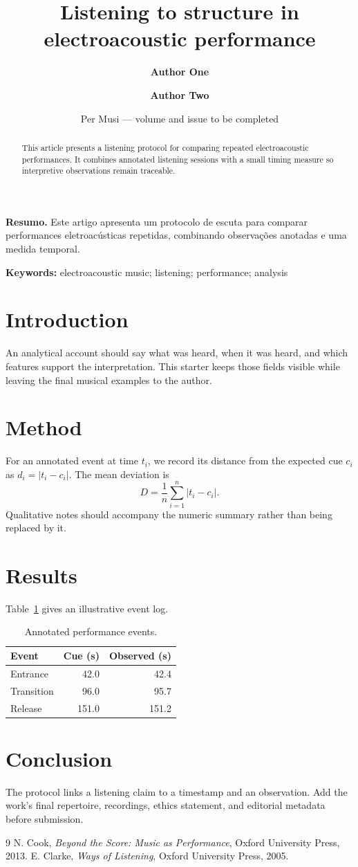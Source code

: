 \documentclass[11pt,a4paper]{article}
\title{Listening to structure in electroacoustic performance}
\author{\textbf{Author One} \and \textbf{Author Two}}
\date{Per Musi --- volume and issue to be completed}
\newcommand{\resumo}[1]{\par\smallskip\textbf{Resumo.} #1}
\newcommand{\keywords}[1]{\par\smallskip\textbf{Keywords:} #1}
\begin{document}
\maketitle
\begin{abstract}
This article presents a listening protocol for comparing repeated
electroacoustic performances. It combines annotated listening sessions with a
small timing measure so interpretive observations remain traceable.
\end{abstract}
\resumo{Este artigo apresenta um protocolo de escuta para comparar performances
eletroacústicas repetidas, combinando observações anotadas e uma medida temporal.}
\keywords{electroacoustic music; listening; performance; analysis}

\section{Introduction}
An analytical account should say what was heard, when it was heard, and which
features support the interpretation. This starter keeps those fields visible
while leaving the final musical examples to the author.

\section{Method}
For an annotated event at time $t_i$, we record its distance from the expected
cue $c_i$ as $d_i=|t_i-c_i|$. The mean deviation is
\begin{equation}
  D=\frac{1}{n}\sum_{i=1}^{n}|t_i-c_i|.
\end{equation}
Qualitative notes should accompany the numeric summary rather than being
replaced by it.

\section{Results}
Table~\ref{tab:events} gives an illustrative event log.
\begin{table}[ht]
\centering
\caption{Annotated performance events.}
\label{tab:events}
\begin{tabular}{lrr}
\toprule
Event & Cue (s) & Observed (s)\\
\midrule
Entrance & 42.0 & 42.4\\
Transition & 96.0 & 95.7\\
Release & 151.0 & 151.2\\
\bottomrule
\end{tabular}
\end{table}

\section{Conclusion}
The protocol links a listening claim to a timestamp and an observation. Add
the work's final repertoire, recordings, ethics statement, and editorial
metadata before submission.

\begin{thebibliography}{9}
 N. Cook, \emph{Beyond the Score: Music as Performance}, Oxford
University Press, 2013.
 E. Clarke, \emph{Ways of Listening}, Oxford University Press,
2005.
\end{thebibliography}
\end{document}
